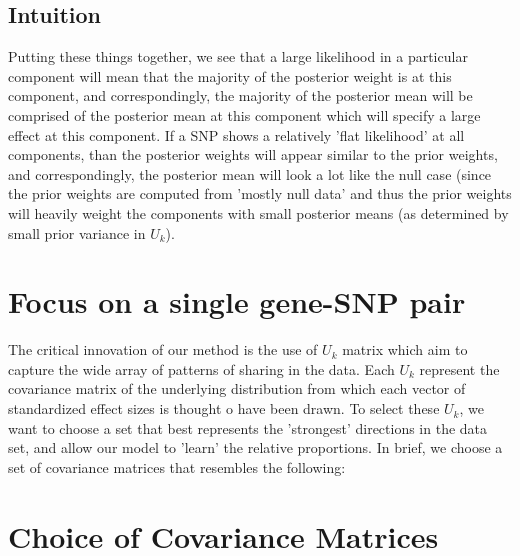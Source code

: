 \documentclass[10pt]{article}
\begin{document}


\subsection{Intuition}
Putting these things together, we see that a large likelihood in a particular component will mean that the majority of the posterior weight is at this component, and correspondingly, the majority of the posterior mean will be comprised of the posterior mean at this component which will specify a large effect at this component. If a SNP shows a relatively 'flat likelihood' at all components, than the posterior weights will appear similar to the prior weights, and correspondingly, the posterior mean will look a lot like the null case (since the prior weights are computed from 'mostly null data' and thus the prior weights will heavily weight the components with small posterior means (as determined by small prior variance in $U_{k}$).







\section{Focus on a single gene-SNP pair}

The critical innovation of our method is the use of $U_{k}$ matrix which aim to capture the wide array of patterns of sharing in the data. Each $U_{k}$ represent the covariance matrix of the underlying distribution from which each vector of standardized effect sizes is thought o have been drawn. To select these $U_{k}$, we want to choose a set that best represents the 'strongest' directions in the data set, and allow our model to 'learn' the relative proportions. In brief, we choose a set of covariance matrices that resembles the following:



\section{Choice of Covariance Matrices}
\end{document}

